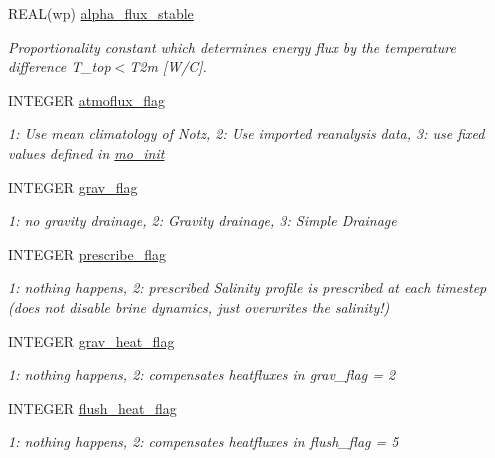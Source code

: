 \begin{DoxyCompactItemize}
REAL(wp) \hyperlink{namespacemo__data_a5d103f2250083f57def04a08d89be231}{alpha\_\-flux\_\-stable}
\begin{DoxyCompactList}\small\item\em Proportionality constant which determines energy flux by the temperature difference T\_\-top$<$T2m \mbox{[}W/C\mbox{]}. \item\end{DoxyCompactList}\item 
INTEGER \hyperlink{namespacemo__data_ac3bc82dac4d101806cd2a77f3b23d92c}{atmoflux\_\-flag}
\begin{DoxyCompactList}\small\item\em 1: Use mean climatology of Notz, 2: Use imported reanalysis data, 3: use fixed values defined in \hyperlink{namespacemo__init}{mo\_\-init} \item\end{DoxyCompactList}\item 
INTEGER \hyperlink{namespacemo__data_ac9c9cead6d68b7413f41e70c9038e9c7}{grav\_\-flag}
\begin{DoxyCompactList}\small\item\em 1: no gravity drainage, 2: Gravity drainage, 3: Simple Drainage \item\end{DoxyCompactList}\item 
INTEGER \hyperlink{namespacemo__data_af60329c080a609cfb936b65d8a62e70c}{prescribe\_\-flag}
\begin{DoxyCompactList}\small\item\em 1: nothing happens, 2: prescribed Salinity profile is prescribed at each timestep (does not disable brine dynamics, just overwrites the salinity!) \item\end{DoxyCompactList}\item 
INTEGER \hyperlink{namespacemo__data_aab5e39e0b6060d7ef40979d070b89dca}{grav\_\-heat\_\-flag}
\begin{DoxyCompactList}\small\item\em 1: nothing happens, 2: compensates heatfluxes in grav\_\-flag = 2 \item\end{DoxyCompactList}\item 
INTEGER \hyperlink{namespacemo__data_a2f88c08cc3cae9d46a6bdcd9232ddbfa}{flush\_\-heat\_\-flag}
\begin{DoxyCompactList}\small\item\em 1: nothing happens, 2: compensates heatfluxes in flush\_\-flag = 5 \item\end{DoxyCompactList}\item 

\end{DoxyCompactItemize}
